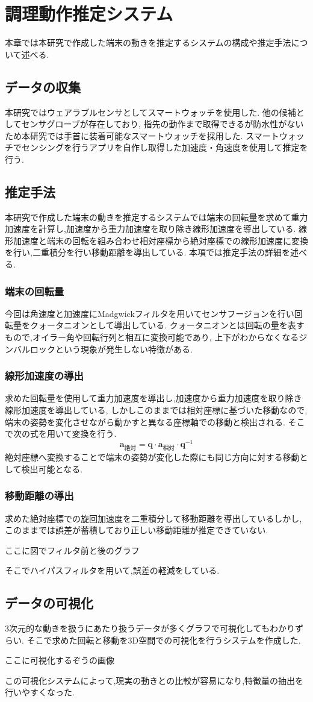 \section{調理動作推定システム}
本章では本研究で作成した端末の動きを推定するシステムの構成や推定手法について述べる.


\subsection{データの収集}
本研究ではウェアラブルセンサとしてスマートウォッチを使用した.
他の候補としてセンサグローブが存在しており,
指先の動作まで取得できるが防水性がないため本研究では手首に装着可能なスマートウォッチを採用した.
スマートウォッチでセンシングを行うアプリを自作し取得した加速度・角速度を使用して推定を行う.
\subsection{推定手法}
本研究で作成した端末の動きを推定するシステムでは端末の回転量を求めて重力加速度を計算し,加速度から重力加速度を取り除き線形加速度を導出している.
線形加速度と端末の回転を組み合わせ相対座標から絶対座標での線形加速度に変換を行い,二重積分を行い移動距離を導出している.
本項では推定手法の詳細を述べる.
\subsubsection{端末の回転量}
今回は角速度と加速度にMadgwickフィルタを用いてセンサフージョンを行い回転量をクォータニオンとして導出している.
クォータニオンとは回転の量を表すもので,オイラー角や回転行列と相互に変換可能であり,
上下がわからなくなるジンバルロックという現象が発生しない特徴がある.
\subsubsection{線形加速度の導出}
求めた回転量を使用して重力加速度を導出し,加速度から重力加速度を取り除き線形加速度を導出している,
しかしこのままでは相対座標に基づいた移動なので,端末の姿勢を変化させながら動かすと異なる座標軸での移動と検出される.
そこで次の式を用いて変換を行う.
\[
\mathbf{a}_{\text{絶対}} = \mathbf{q} \cdot \mathbf{a}_{\text{相対}} \cdot \mathbf{q}^{-1}
\]
絶対座標へ変換することで端末の姿勢が変化した際にも同じ方向に対する移動として検出可能となる.

\subsubsection{移動距離の導出}
求めた絶対座標での旋回加速度を二重積分して移動距離を導出しているしかし,
このままでは誤差が蓄積しており正しい移動距離が推定できていない.

ここに図でフィルタ前と後のグラフ

そこでハイパスフィルタを用いて,誤差の軽減をしている.

\subsection{データの可視化}
3次元的な動きを扱うにあたり扱うデータが多くグラフで可視化してもわかりずらい.
そこで求めた回転と移動を3D空間での可視化を行うシステムを作成した.

ここに可視化するぞうの画像

この可視化システムによって,現実の動きとの比較が容易になり,特徴量の抽出を行いやすくなった.